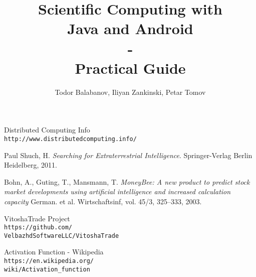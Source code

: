 \documentclass[book,a5paper,12pt,oneside,openany]{memoir}
\title{Scientific Computing with\\Java and Android\\-\\Practical Guide}
\author{Todor Balabanov, Iliyan Zankinski, Petar Tomov}
\begin{document}
\maketitle

\thispagestyle{empty}




\newpage
{}

\newpage
\tableofcontents

\renewcommand\thesection{\thechapter.\arabic{section}}
\renewcommand\thesubsection{\thesection.\arabic{subsection}}











\newpage
\begin{thebibliography}{99}

 Distributed Computing Info \\\texttt{http://www.distributedcomputing.info/}

 Paul Shuch, H. \textit{Searching for Extraterrestrial Intelligence}. Springer-Verlag Berlin Heidelberg, 2011.

 Bohn, A., Guting, T., Mansmann, T. \textit{MoneyBee: A new product to predict stock market developments using artificial intelligence and increased calculation capacity} German. et al. Wirtschaftsinf, vol. 45/3, 325--333, 2003.

 VitoshaTrade Project \\\texttt{https://github.com/\\VelbazhdSoftwareLLC/VitoshaTrade}

 Activation Function - Wikipedia \\\texttt{https://en.wikipedia.org/\\wiki/Activation\_function}
\end{thebibliography}

\newpage
\listoffigures


\newpage
\printindex
\end{document}
